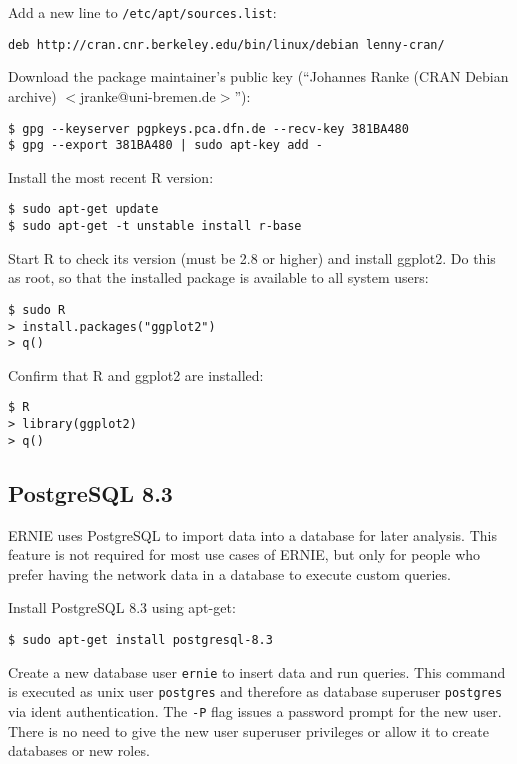 \documentclass{article}
\begin{document}
Add a new line to \verb+/etc/apt/sources.list+:

\begin{verbatim}
deb http://cran.cnr.berkeley.edu/bin/linux/debian lenny-cran/
\end{verbatim}

Download the package maintainer's public key (``Johannes Ranke (CRAN Debian
archive) $<$jranke@uni-bremen.de$>$''):

\begin{verbatim}
$ gpg --keyserver pgpkeys.pca.dfn.de --recv-key 381BA480
$ gpg --export 381BA480 | sudo apt-key add -
\end{verbatim}

Install the most recent R version:

\begin{verbatim}
$ sudo apt-get update
$ sudo apt-get -t unstable install r-base
\end{verbatim}

Start R to check its version (must be 2.8 or higher) and install ggplot2.
Do this as root, so that the installed package is available to all system
users:

\begin{verbatim}
$ sudo R
> install.packages("ggplot2")
> q()
\end{verbatim}

Confirm that R and ggplot2 are installed:

\begin{verbatim}
$ R
> library(ggplot2)
> q()
\end{verbatim}

\subsection{PostgreSQL 8.3}
\label{sec-install-postgres}

ERNIE uses PostgreSQL to import data into a database for later analysis.
This feature is not required for most use cases of ERNIE, but only for
people who prefer having the network data in a database to execute custom
queries.

Install PostgreSQL 8.3 using apt-get:

\begin{verbatim}
$ sudo apt-get install postgresql-8.3
\end{verbatim}

Create a new database user \verb+ernie+ to insert data and run queries.
This command is executed as unix user \verb+postgres+ and therefore as
database superuser \verb+postgres+ via ident authentication. The
\verb+-P+ flag issues a password prompt for the new user.
There is no need to give the new user superuser privileges or allow it to
create databases or new roles.
\end{document}
